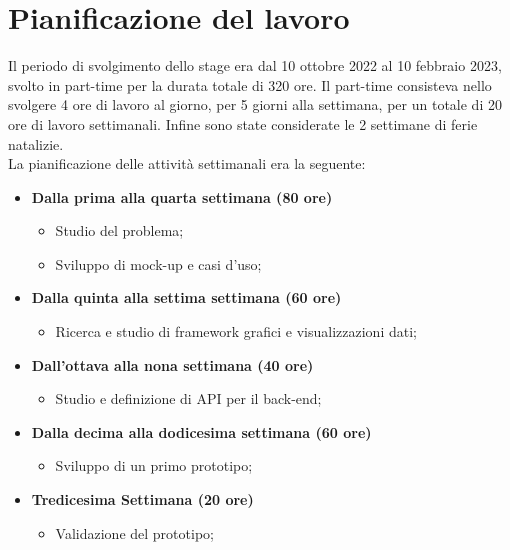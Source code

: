 \section{Pianificazione del lavoro}
Il periodo di svolgimento dello stage era dal 10 ottobre 2022 al 10 febbraio 2023, svolto in part-time per la durata totale di 320 ore. Il part-time consisteva nello svolgere 4 ore di lavoro al giorno, per 5 giorni alla settimana, per un totale di 20 ore di lavoro settimanali.
Infine sono state considerate le 2 settimane di ferie natalizie.
\\
La pianificazione delle attività settimanali era la seguente:
  \begin{itemize}
	
        \item[] \textbf{Dalla prima alla quarta settimana (80 ore)} 
	\begin{itemize}
            	\item{Studio del problema};
	 	\item{Sviluppo di mock-up e casi d'uso};
	\end{itemize}
       

        \item[] \textbf{Dalla quinta alla settima settimana (60 ore)} 
	\begin{itemize}
            	\item{Ricerca e studio di framework grafici e visualizzazioni dati};
	 	
	\end{itemize}
        
	\item[] \textbf{Dall'ottava alla nona settimana (40 ore)}
	\begin{itemize}
            	\item {Studio e definizione di \gls{API} per il back-end};
	\end{itemize}
        
       \item[] \textbf{Dalla decima alla dodicesima settimana (60 ore)} 
	\begin{itemize}
            	\item {Sviluppo di un primo prototipo};
	\end{itemize}
        
        \item[] \textbf{Tredicesima Settimana (20 ore)} 
	\begin{itemize}
            	\item{Validazione del prototipo};
	 	

\end{itemize}
\end{itemize}
